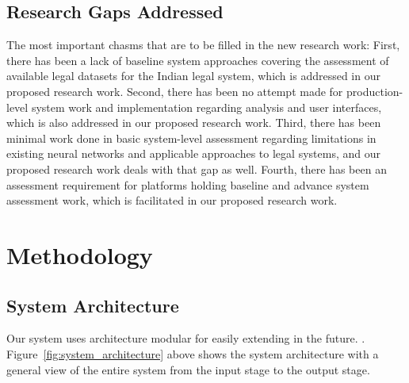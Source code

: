 \documentclass{llncs}
\begin{document}
\subsection{Research Gaps Addressed}

The most important chasms that are to be filled in the new research work: First, there has been a lack of baseline system approaches covering the assessment of available legal datasets for the Indian legal system, which is addressed in our proposed research work. Second, there has been no attempt made for production-level system work and implementation regarding analysis and user interfaces, which is also addressed in our proposed research work. Third, there has been minimal work done in basic system-level assessment regarding limitations in existing neural networks and applicable approaches to legal systems, and our proposed research work deals with that gap as well. Fourth, there has been an assessment requirement for platforms holding baseline and advance system assessment work, which is facilitated in our proposed research work.

\section{Methodology}

\subsection{System Architecture}

Our system uses architecture modular for easily extending in the future. . Figure~\ref{fig:system_architecture} above shows the system architecture with a general view of the entire system from the input stage to the output stage.
\end{document}
